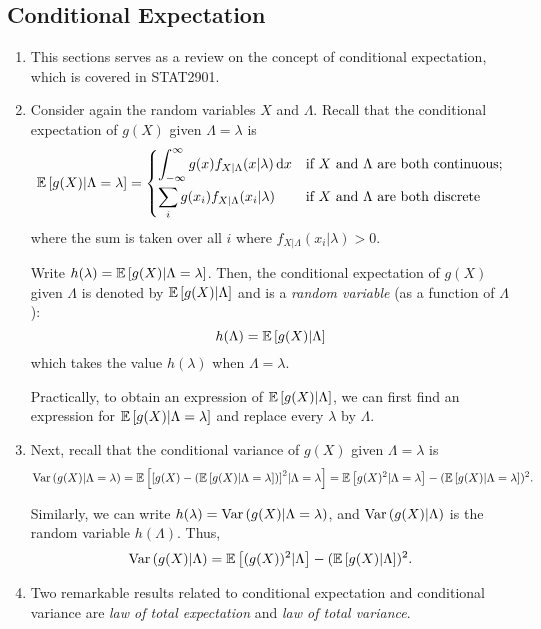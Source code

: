 \subsection{Conditional Expectation}
\begin{enumerate}
\item This sections serves as a review on the concept of conditional
expectation, which is covered in STAT2901.
\item Consider again the random variables \(X\) and \(\Lambda\). Recall that
the conditional expectation of \(g(X)\) given \(\Lambda=\lambda\) is
\[
\mathbb{E}\left[g(X)|\Lambda=\lambda\right]=
\begin{cases}
\displaystyle
\int_{-\infty}^{\infty}g(x)f_{X|\Lambda}(x|\lambda)\dd{x}&\text{if \(X\) and \(\Lambda\) are both continuous};\\
\displaystyle
\sum_{i}^{}g(x_i)f_{X|\Lambda}(x_i|\lambda)&\text{if \(X\) and \(\Lambda\) are both discrete}\\
\end{cases}
\]
where the sum is taken over all \(i\) where \(f_{X|\Lambda}(x_i|\lambda)>0\).

Write \(h(\lambda)=\mathbb{E}\left[g(X)|\Lambda=\lambda\right]\).  Then, the conditional
expectation of \(g(X)\) given \(\Lambda\) is denoted by \(\mathbb{E}\left[g(X)|\Lambda\right]\)
and is a \emph{random variable} (as a function of \(\Lambda\)):
\[
h(\Lambda)=\mathbb{E}\left[g(X)|\Lambda\right]
\]
which takes the value \(h(\lambda)\) when \(\Lambda=\lambda\).

\begin{note}
Practically, to obtain an expression of \(\mathbb{E}\left[g(X)|\Lambda\right]\), we can first
find an expression for \(\mathbb{E}\left[g(X)|\Lambda=\lambda\right]\) and replace every
\(\lambda\) by \(\Lambda\).
\end{note}
\item Next, recall that the conditional variance of \(g(X)\) given
\(\Lambda=\lambda\) is
\[
\operatorname{Var}\left(g(X)|\Lambda=\lambda\right)
=\mathbb{E}\left[\qty[g(X)-(\mathbb{E}\left[g(X)|\Lambda=\lambda\right])]^{2}|\Lambda=\lambda\right]
=\mathbb{E}\left[g(X)^2|\Lambda=\lambda\right]-(\mathbb{E}\left[g(X)|\Lambda=\lambda\right])^2.
\]
\begin{note}
Similarly, we can write \(h(\lambda)=\operatorname{Var}\left(g(X)|\Lambda=\lambda\right)\), and
\(\operatorname{Var}\left(g(X)|\Lambda\right)\) is the random variable \(h(\Lambda)\). Thus,
\[
\operatorname{Var}\left(g(X)|\Lambda\right)=\mathbb{E}\left[(g(X))^{2}|\Lambda\right]-(\mathbb{E}\left[g(X)|\Lambda\right])^{2}.
\]
\end{note}
\item Two remarkable results related to conditional expectation and conditional
variance are \emph{law of total expectation} and \emph{law of total variance}.


\end{enumerate}
